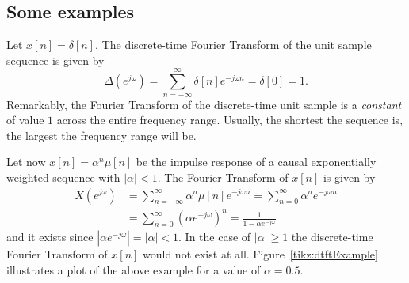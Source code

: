 \documentclass[\documentfontsize, twocolumn]{\classname}
\begin{document}
\subsection{Some examples}\label{sec:someExamplesDTFT}
Let $x[n] = \delta[n]$. The discrete-time Fourier Transform of the unit sample sequence is given by
\[
    \Delta(e^{j\omega}) = \sum_{n=-\infty}^\infty \delta[n]e^{-j\omega n} = \delta[0] = 1.
\]
Remarkably, the Fourier Transform of the discrete-time unit sample is a \emph{constant} of value $1$ across the entire frequency range. Usually, the shortest the sequence is, the largest the frequency range will be.

Let now $x[n] = \alpha^n\mu[n]$ be the impulse response of a causal exponentially weighted sequence with $|\alpha|<1$. The Fourier Transform of $x[n]$ is given by
\begin{align*}
    X(e^{j\omega}) &= \sum_{n=-\infty}^\infty \alpha^n\mu[n]e^{-j\omega n} = \sum_{n=0}^\infty \alpha^n e^{-j\omega n} \\
                   &= \sum_{n=0}^\infty \left(\alpha e^{-j\omega}\right)^n = \frac{1}{1-\alpha e^{-j\omega}}
\end{align*}
and it exists since $\left|\alpha e^{-j\omega}\right| = |\alpha| < 1$. In the case of $|\alpha| \geq 1$ the discrete-time Fourier Transform of $x[n]$ would not exist at all. Figure~\ref{tikz:dtftExample} illustrates a plot of the above example for a value of $\alpha=0.5$.
\end{document}

